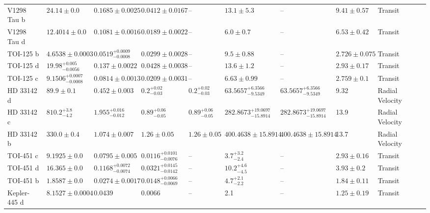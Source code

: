 \begin{tabular}{llllllllll}
V1298 Tau b & $24.14 \pm 0.0$ & $0.1685 \pm 0.0025$ & $0.0412 \pm 0.0167$ & -- & $13.1 \pm 5.3$ & -- & $9.41 \pm 0.57$ & Transit & \cite{LIVINGSTON_ET_AL_2026} \\
V1298 Tau d & $12.4014 \pm 0.0$ & $0.1081 \pm 0.0016$ & $0.0189 \pm 0.0022$ & -- & $6.0 \pm 0.7$ & -- & $6.53 \pm 0.42$ & Transit & \cite{LIVINGSTON_ET_AL_2026} \\
TOI-125 b & $4.6538 \pm 0.0003$ & $0.0519^{+0.0009}_{-0.0008}$ & $0.0299 \pm 0.0028$ & -- & $9.5 \pm 0.88$ & -- & $2.726 \pm 0.075$ & Transit & \cite{NIELSEN_ET_AL__2020} \\
TOI-125 d & $19.98^{+0.005}_{-0.0056}$ & $0.137 \pm 0.0022$ & $0.0428 \pm 0.0038$ & -- & $13.6 \pm 1.2$ & -- & $2.93 \pm 0.17$ & Transit & \cite{NIELSEN_ET_AL__2020} \\
TOI-125 c & $9.1506^{+0.0007}_{-0.0008}$ & $0.0814 \pm 0.0013$ & $0.0209 \pm 0.0031$ & -- & $6.63 \pm 0.99$ & -- & $2.759 \pm 0.1$ & Transit & \cite{NIELSEN_ET_AL__2020} \\
HD 33142 d & $89.9 \pm 0.1$ & $0.452 \pm 0.003$ & $0.2^{+0.02}_{-0.03}$ & $0.2^{+0.02}_{-0.03}$ & $63.5657^{+6.3566}_{-9.5349}$ & $63.5657^{+6.3566}_{-9.5349}$ & 9.32 & Radial Velocity & \cite{TRIFONOV_ET_AL_2022} \\
HD 33142 c & $810.2^{+3.8}_{-4.2}$ & $1.955^{+0.016}_{-0.012}$ & $0.89^{+0.06}_{-0.05}$ & $0.89^{+0.06}_{-0.05}$ & $282.8673^{+19.0697}_{-15.8914}$ & $282.8673^{+19.0697}_{-15.8914}$ & 13.9 & Radial Velocity & \cite{TRIFONOV_ET_AL_2022} \\
HD 33142 b & $330.0 \pm 0.4$ & $1.074 \pm 0.007$ & $1.26 \pm 0.05$ & $1.26 \pm 0.05$ & $400.4638 \pm 15.8914$ & $400.4638 \pm 15.8914$ & 13.7 & Radial Velocity & \cite{TRIFONOV_ET_AL_2022} \\
TOI-451 c & $9.1925 \pm 0.0$ & $0.0795 \pm 0.005$ & $0.0116^{+0.0101}_{-0.0076}$ & -- & $3.7^{+3.2}_{-2.4}$ & -- & $2.93 \pm 0.16$ & Transit & \cite{BARRAGAN_ET_AL_2026} \\
TOI-451 d & $16.365 \pm 0.0$ & $0.1168^{+0.0072}_{-0.0074}$ & $0.0321^{+0.0145}_{-0.0142}$ & -- & $10.2^{+4.6}_{-4.5}$ & -- & $3.93 \pm 0.2$ & Transit & \cite{BARRAGAN_ET_AL_2026} \\
TOI-451 b & $1.8587 \pm 0.0$ & $0.0274 \pm 0.0017$ & $0.0148^{+0.0066}_{-0.0069}$ & -- & $4.7^{+2.1}_{-2.2}$ & -- & $1.84 \pm 0.11$ & Transit & \cite{BARRAGAN_ET_AL_2026} \\
Kepler-445 d & $8.1527 \pm 0.0004$ & 0.0439 & 0.0066 & -- & 2.1 & -- & $1.25 \pm 0.19$ & Transit & \cite{MUIRHEAD_ET_AL__2015} \\

\end{tabular}
